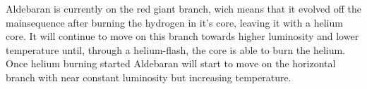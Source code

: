 \documentclass[11pt,a4paper]{scrartcl}
\begin{document}
\begin{enumerate}[label=\textbf{\large(\alph*)}, itemsep=2\baselineskip]
    Aldebaran is currently on the red giant branch, wich means that it evolved
    off the mainsequence after burning the hydrogen in it's core, leaving it
    with a helium core.  It will continue to move on this branch towards higher
    luminosity and lower temperature until, through a helium-flash, the core is
    able to burn the helium.  Once helium burning started Aldebaran will start
    to move on the horizontal branch with near constant luminosity but
    increasing temperature.

\end{enumerate}

\newpage


\end{document}
